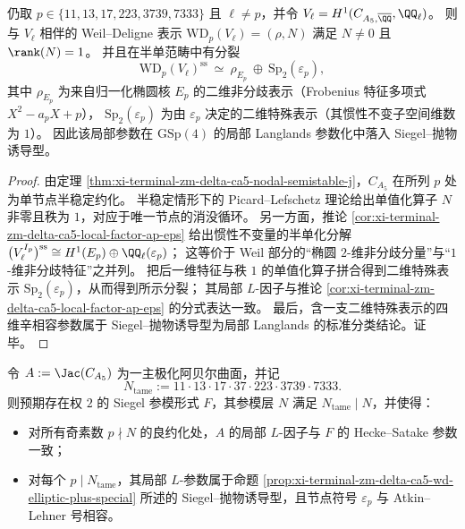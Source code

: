 \begin{proposition}\label{prop:xi-terminal-zm-delta-ca5-wd-elliptic-plus-special}
仍取 \(p\in\{11,13,17,223,3739,7333\}\) 且 \(\ell\neq p\)，并令 \(V_\ell=H^1(C_{A_5,\overline{\QQ}},\QQ_\ell)\)。
则与 \(V_\ell\) 相伴的 Weil--Deligne 表示 \(\mathrm{WD}_p(V_\ell)=(\rho,N)\) 满足 \(N\neq 0\) 且 \(\rank(N)=1\)。
并且在半单范畴中有分裂
\[
\mathrm{WD}_p(V_\ell)^{\mathrm{ss}}\ \simeq\ \rho_{E_p}\ \oplus\ \mathrm{Sp}_{2}(\varepsilon_p),
\]
其中 \(\rho_{E_p}\) 为来自归一化椭圆核 \(E_p\) 的二维非分歧表示（Frobenius 特征多项式 \(X^2-a_pX+p\)），
\(\mathrm{Sp}_{2}(\varepsilon_p)\) 为由 \(\varepsilon_p\) 决定的二维特殊表示（其惯性不变子空间维数为 \(1\)）。
因此该局部参数在 \(\mathrm{GSp}(4)\) 的局部 Langlands 参数化中落入 Siegel--抛物诱导型。
\end{proposition}
\begin{proof}
由定理 \ref{thm:xi-terminal-zm-delta-ca5-nodal-semistable-j}，\(C_{A_5}\) 在所列 \(p\) 处为单节点半稳定约化。
半稳定情形下的 Picard--Lefschetz 理论给出单值化算子 \(N\) 非零且秩为 \(1\)，对应于唯一节点的消没循环。
另一方面，推论 \ref{cor:xi-terminal-zm-delta-ca5-local-factor-ap-eps} 给出惯性不变量的半单化分解
\(
\bigl(V_\ell^{I_p}\bigr)^{\mathrm{ss}}\cong H^1(E_p)\oplus \QQ_\ell(\varepsilon_p)
\)；
这等价于 Weil 部分的“椭圆 \(2\)-维非分歧分量”与“\(1\)-维非分歧特征”之并列。
把后一维特征与秩 \(1\) 的单值化算子拼合得到二维特殊表示 \(\mathrm{Sp}_2(\varepsilon_p)\)，从而得到所示分裂；
其局部 \(L\)-因子与推论 \ref{cor:xi-terminal-zm-delta-ca5-local-factor-ap-eps} 的分式表达一致。
最后，含一支二维特殊表示的四维辛相容参数属于 Siegel--抛物诱导型为局部 Langlands 的标准分类结论。证毕。
\end{proof}

\begin{conjecture}\label{conj:xi-terminal-zm-delta-ca5-paramodularity}
令 \(A:=\Jac(C_{A_5})\) 为一主极化阿贝尔曲面，并记
\[
N_{\mathrm{tame}}:=11\cdot 13\cdot 17\cdot 37\cdot 223\cdot 3739\cdot 7333.
\]
则预期存在权 \(2\) 的 Siegel 参模形式 \(F\)，其参模层 \(N\) 满足 \(N_{\mathrm{tame}}\mid N\)，并使得：
\begin{itemize}
  \item 对所有奇素数 \(p\nmid N\) 的良约化处，\(A\) 的局部 \(L\)-因子与 \(F\) 的 Hecke--Satake 参数一致；
  \item 对每个 \(p\mid N_{\mathrm{tame}}\)，其局部 \(L\)-参数属于命题 \ref{prop:xi-terminal-zm-delta-ca5-wd-elliptic-plus-special} 所述的 Siegel--抛物诱导型，且节点符号 \(\varepsilon_p\) 与 Atkin--Lehner 号相容。
\end{itemize}
\end{conjecture}

\endinput

